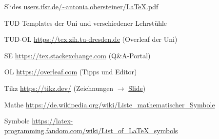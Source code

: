 \documentclass{article}
\begin{document}
\begin{itemize}
	\item[Slides] \url{users.ifsr.de/~antonia.obersteiner/LaTeX.pdf}
	\item[TUD] Templates der Uni und verschiedener Lehrstühle
	\item[TUD-OL] \url{https://tex.zih.tu-dresden.de} (Overleaf der Uni)
	\item[SE] \url{https://tex.stackexchange.com} (Q\&A-Portal)
	\item[OL] \url{https://overleaf.com} (Tipps und Editor)
	\item[Tikz] \url{https://tikz.dev/}
		(Zeichnungen $\to$ \hyperlink{tikz-final}{Slide})
	\item[Mathe] \url{https://de.wikipedia.org/wiki/Liste_mathematischer_Symbole}
	\item[Symbole] \url{https://latex-programming.fandom.com/wiki/List_of_LaTeX_symbols}
\end{itemize}
\end{document}
